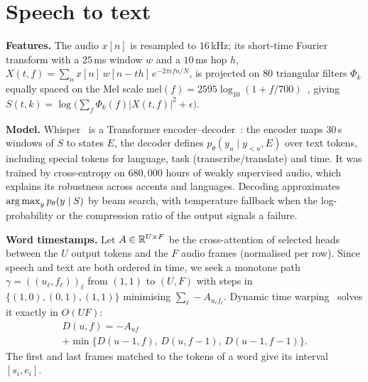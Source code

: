 \documentclass[10pt,twocolumn]{article}
\begin{document}
\maketitle

\begin{abstract}
\noindent We describe the mathematics behind a pipeline that turns a raw video into a captioned, scored video published on YouTube, TikTok and Instagram. Speech is transcribed by Whisper, an encoder--decoder Transformer on log-Mel spectrograms; word timestamps are obtained by dynamic time warping on cross-attention; captions are formed by an optimal segmentation of the word sequence and highlighted word by word with drift-free rounding. Background music is sampled from MusicGen, an autoregressive Transformer over residual-vector-quantised audio codes with classifier-free guidance, conditioned on a prompt extracted from the transcript, and mixed at a target loudness. Distribution is a scheduling problem under API quotas.
\end{abstract}

\section{Speech to text}
\textbf{Features.} The audio $x[n]$ is resampled to $16$\,kHz; its short-time Fourier transform with a $25$\,ms window $w$ and a $10$\,ms hop $h$,
$X(t,f)=\sum_nx[n]\,w[n-th]\,e^{-2\pi ifn/N}$,
is projected on $80$ triangular filters $\Phi_k$ equally spaced on the Mel scale $\mathrm{mel}(f)=2595\log_{10}(1+f/700)$~\cite{stevens1937}, giving $S(t,k)=\log\big(\sum_f\Phi_k(f)|X(t,f)|^2+\epsilon\big)$.

\textbf{Model.} Whisper~\cite{radford2023} is a Transformer encoder--decoder~\cite{vaswani2017}: the encoder maps $30$\,s windows of $S$ to states $E$, the decoder defines $p_\theta(y_u\mid y_{<u},E)$ over text tokens, including special tokens for language, task (transcribe/translate) and time. It was trained by cross-entropy on $680{,}000$ hours of weakly supervised audio, which explains its robustness across accents and languages. Decoding approximates $\operatorname*{arg\,max}_yp_\theta(y\mid S)$ by beam search, with temperature fallback when the log-probability or the compression ratio of the output signals a failure.

\textbf{Word timestamps.} Let $A\in\mathbb{R}^{U\times F}$ be the cross-attention of selected heads between the $U$ output tokens and the $F$ audio frames (normalised per row). Since speech and text are both ordered in time, we seek a monotone path $\gamma=((u_\ell,f_\ell))_\ell$ from $(1,1)$ to $(U,F)$ with steps in $\{(1,0),(0,1),(1,1)\}$ minimising $\sum_\ell-A_{u_\ell f_\ell}$. Dynamic time warping~\cite{sakoe1978} solves it exactly in $O(UF)$:
\begin{multline}
D(u,f)=-A_{uf}\\+\min\{D(u{-}1,f),\,D(u,f{-}1),\,D(u{-}1,f{-}1)\}.
\end{multline}
The first and last frames matched to the tokens of a word give its interval $[s_i,e_i]$.
\end{document}
